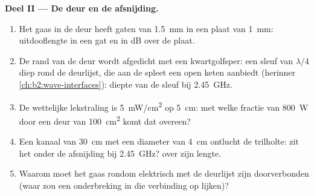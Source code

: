 \begin{problem}
\medskip
\noindent\textbf{Deel II --- De deur en de afsnijding.}
\begin{enumerate}[resume]
  \item Het gaas in de deur heeft gaten van \qty{1.5}{mm} in een plaat van
        \qty{1}{mm}: uitdooflengte in een gat en  in dB over de
        plaat.
  \item De rand van de deur wordt afgedicht met een kwartgolfsper: een sleuf
        van $\lambda/4$ diep rond de deurlijst, die aan de spleet een open
        keten aanbiedt (herinner \cref{ch:b2:wave-interfaces}): diepte van
        de sleuf bij \qty{2.45}{GHz}.
  \item De wettelijke lekstraling is \qty{5}{mW/cm^2} op \qty{5}{cm}: met
        welke fractie van \qty{800}{W} door een deur van \qty{100}{cm^2}
        komt dat overeen?
  \item Een kanaal van \qty{30}{cm} met een diameter van \qty{4}{cm}
        ontlucht de trilholte: zit het onder de afsnijding bij
        \qty{2.45}{GHz}?  over zijn lengte.
  \item Waarom moet het gaas rondom elektrisch met de deurlijst zijn
        doorverbonden (waar zou een onderbreking in die verbinding op
        lijken)?
\end{enumerate}


\end{problem}
